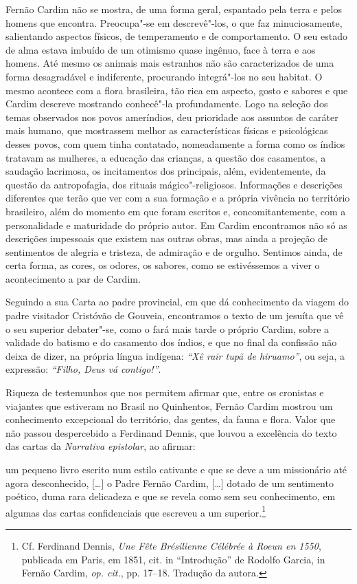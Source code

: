 Fernão Cardim não se mostra, de uma forma geral, espantado pela terra
e pelos homens que encontra. Preocupa"-se em descrevê"-los, o que faz
minuciosamente, salientando aspectos físicos, de temperamento e de
comportamento. O seu estado de alma estava imbuído de um otimismo
quase ingênuo, face à terra e aos homens. Até mesmo os animais mais
estranhos não são caracterizados de uma forma desagradável e
indiferente, procurando integrá"-los no seu habitat. O mesmo acontece
com a flora brasileira, tão rica em aspecto, gosto e sabores e que
Cardim descreve mostrando conhecê"-la profundamente. Logo na seleção
dos temas observados nos povos ameríndios, deu prioridade aos assuntos
de caráter mais humano, que mostrassem melhor as características
físicas e psicológicas desses povos, com quem tinha contatado,
nomeadamente a forma como os índios tratavam as mulheres, a educação
das crianças, a questão dos casamentos, a saudação lacrimosa, os
incitamentos dos principais, além, evidentemente, da questão da
antropofagia, dos rituais mágico"-religiosos. 
Informações e descrições diferentes que terão que ver com a sua
formação e a própria vivência no território brasileiro, além do momento
em que foram escritos e, concomitantemente, com a personalidade e
maturidade do próprio autor. Em Cardim encontramos não só as descrições
impessoais que existem nas outras obras, mas ainda a projeção de
sentimentos de alegria e tristeza, de admiração e de orgulho.
Sentimos ainda, de certa forma, as cores, os odores, os sabores, como
se estivéssemos a viver o acontecimento a par de Cardim.

Seguindo a sua Carta ao padre provincial, em que dá conhecimento da
viagem do padre visitador Cristóvão de Gouveia, encontramos o texto de
um jesuíta que vê o seu superior debater"-se, como o fará mais tarde o
próprio Cardim, sobre a validade do batismo e do casamento dos índios,
e que no final da confissão não deixa de dizer, na própria língua
indígena: \textit{``Xê rair tupã de hiruamo''}, ou seja, a expressão: \textit{``Filho, Deus vá contigo!''}. 

Riqueza de testemunhos que nos permitem afirmar que, entre os
cronistas e viajantes que estiveram no Brasil no Quinhentos, Fernão
Cardim mostrou um conhecimento excepcional do território, das gentes,
da fauna e flora. Valor que não passou despercebido a Ferdinand Dennis,
que louvou a excelência do texto das cartas da \textit{Narrativa
epistolar}, ao afirmar:

\begin{hedraquote}
um pequeno livro escrito num estilo cativante e que se deve a um missionário
até agora desconhecido, [\ldots{}] o Padre Fernão Cardim, [\ldots{}] dotado de um
sentimento poético, duma rara delicadeza e que se revela como sem seu
conhecimento, em algumas das cartas confidenciais que escreveu a um
superior.\footnote{ Cf. Ferdinand Dennis, \textit{Une Fête Brésilienne 
Célébrée à Roeun en 1550}, publicada em Paris, em 1851,
cit. in ``Introdução'' de Rodolfo Garcia, in Fernão Cardim, \textit{op. cit.}, 
pp. 17--18. Tradução da autora.} 
\end{hedraquote}

